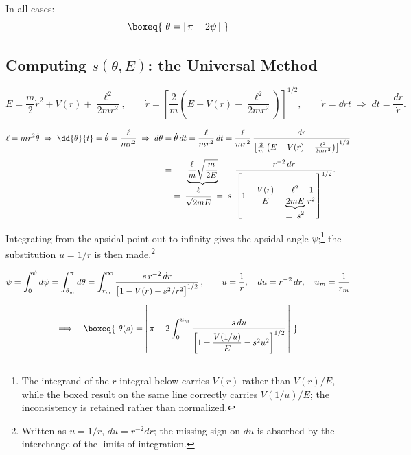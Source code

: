 \documentclass[11pt]{article}
\begin{document}
In all cases:
\begin{equation}
\boxeq{\ \theta = \lvert\, \pi - 2\psi\, \rvert\ }
\label{eq:allcases}
\end{equation}

\subsection{Computing \texorpdfstring{$s(\theta,E)$}{s(theta,E)}: the Universal Method}

\begin{equation}
E = \frac{m}{2}\dot r^{2} + V(r) + \frac{\ell^{2}}{2mr^{2}},
\qquad
\dot r = \left[\frac{2}{m}\left(E - V(r) - \frac{\ell^{2}}{2mr^{2}}\right)\right]^{1/2},
\qquad
\dot r = \dd{r}{t} \;\Rightarrow\; dt = \frac{dr}{\dot r}.
\end{equation}

\begin{align}
\ell = m r^{2}\dot\theta \;\Rightarrow\;
\dd{\theta}{t} = \dot\theta = \frac{\ell}{mr^{2}}
\;\Rightarrow\;
d\theta &= \dot\theta\,dt = \frac{\ell}{mr^{2}}\,dt
 = \frac{\ell}{mr^{2}}\,
   \frac{dr}{\left[\frac{2}{m}\left(E-V(r)-\frac{\ell^{2}}{2mr^{2}}\right)\right]^{1/2}}\notag\\[4pt]
 &= \underbrace{\frac{\ell}{m}\sqrt{\frac{m}{2E}}}_{\displaystyle =\;\frac{\ell}{\sqrt{2mE}}\;=\;s}\;
    \frac{r^{-2}\,dr}{\left[1 - \dfrac{V(r)}{E}
      - \underbrace{\dfrac{\ell^{2}}{2mE}}_{\displaystyle =\;s^{2}}\dfrac{1}{r^{2}}\right]^{1/2}}.
\end{align}

Integrating from the apsidal point out to infinity gives the apsidal angle
$\psi$;\footnote{The integrand of the $r$-integral below carries $V(r)$
rather than $V(r)/E$, while the boxed result on the same line correctly
carries $V(1/u)/E$; the inconsistency is retained rather than normalized.} the substitution
$u=1/r$ is then made.\footnote{Written as $u=1/r$, $du=r^{-2}dr$; the missing
sign on $du$ is absorbed by the interchange of the limits of integration.}

\begin{gather}
\psi = \int_{0}^{\psi}d\psi = \int_{\theta_{m}}^{\pi}d\theta
     = \int_{r_{m}}^{\infty} \frac{s\,r^{-2}\,dr}
       {\bigl[1 - V(r) - s^{2}/r^{2}\bigr]^{1/2}}\,,
\qquad
u = \frac{1}{r},\quad du = r^{-2}\,dr,\quad u_{m} = \frac{1}{r_{m}}\notag\\[6pt]
\Longrightarrow\quad
\boxeq{\ \theta(s) = \left\lvert\, \pi - 2\int_{0}^{u_{m}}
  \frac{s\,du}{\left[1 - \dfrac{V(1/u)}{E} - s^{2}u^{2}\right]^{1/2}} \,\right\rvert\ }
\label{eq:universal}
\end{gather}
\end{document}
